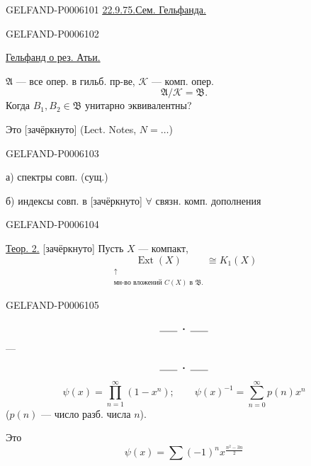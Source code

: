\begin{GelfandAdjacentEvidence}{GELFAND-P000610}{1}
\underline{\underline{22.9.75.}}\qquad\underline{Сем. Гельфанда.}

\end{GelfandAdjacentEvidence}
\begin{GelfandAdjacentEvidence}{GELFAND-P000610}{2}


\underline{Гельфанд о рез. Атьи.}

\(\mathfrak A\) — все опер. в гильб. пр-ве, \(\mathcal K\) — комп. опер.
\[
\mathfrak A/\mathcal K=\mathfrak B.
\]
Когда \(B_1,B_2\in\mathfrak B\) унитарно эквивалентны?

Это [зачёркнуто]  (Lect. Notes, \(N=\ldots\))
\end{GelfandAdjacentEvidence}
\begin{GelfandAdjacentEvidence}{GELFAND-P000610}{3}


а) спектры совп. (сущ.)

б) индексы совп. в [зачёркнуто] \(\forall\) связн. комп. дополнения
\end{GelfandAdjacentEvidence}
\begin{GelfandAdjacentEvidence}{GELFAND-P000610}{4}


\underline{Теор. 2.} [зачёркнуто] Пусть \(X\) — компакт,
\[
\underset{\substack{\uparrow\\\text{мн-во вложений }C(X)\text{ в }\mathfrak B.}}{\operatorname{Ext}(X)}\cong K_1(X)
\]
\end{GelfandAdjacentEvidence}
\begin{GelfandAdjacentEvidence}{GELFAND-P000610}{5}


\[\rule{1.8em}{.4pt}\;\boldsymbol{\cdot}\;\rule{1.8em}{.4pt}\]
 — 
\[\rule{1.8em}{.4pt}\;\boldsymbol{\cdot}\;\rule{1.8em}{.4pt}\]
\[
\psi(x)=\prod_{n=1}^{\infty}(1-x^n);\qquad
\psi(x)^{-1}=\sum_{n=0}^{\infty}p(n)x^n
\]
(\(p(n)\) — число разб. числа \(n\)).

Это
\[
\psi(x)=\sum(-1)^n x^{\frac{n^2-3n}{2}}
\]
\end{GelfandAdjacentEvidence}
